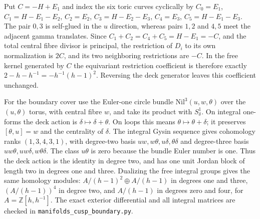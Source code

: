 Put $C=-H+E_1$ and index the six toric curves cyclically by
$C_0=E_1$, $C_1=H-E_1-E_2$, $C_2=E_2$,
$C_3=H-E_2-E_3$, $C_4=E_3$, $C_5=H-E_1-E_3$.
The pair $0,3$ is self-glued in the $u$ direction, whereas
pairs $1,2$ and $4,5$ meet the adjacent gamma translates.
Since $C_1+C_2=C_4+C_5=H-E_1=-C$, and the total central
fibre divisor is principal, the restriction of $D_i$ to its
own normalization is $2C$, and its two neighboring
restrictions are $-C$. In the free kernel generated by $C$
the equivariant restriction coefficient is therefore exactly
$2-h-h^{-1}=-h^{-1}(h-1)^2$. Reversing the deck generator
leaves this coefficient unchanged.

For the boundary cover use the Euler-one circle bundle
$\mathrm{Nil}^3(u,w,\theta)$ over the $(u,\theta)$ torus,
with central fibre $w$, and take its product with $S^1_\delta$.
On integral one-forms the deck action is
$\delta\mapsto\delta+\theta$. On loops this means
$\theta\mapsto\theta+\delta$; it preserves
$[\theta,u]=w$ and the centrality of $\delta$.
The integral Gysin sequence gives cohomology ranks
$(1,3,4,3,1)$, with degree-two basis
$uw,w\theta,u\delta,\theta\delta$ and degree-three basis
$uw\theta,uw\delta,w\theta\delta$. The class $u\theta$
is zero because the bundle Euler number is one. Thus the
deck action is the identity in degree two, and has one
unit Jordan block of length two in degrees one and three.
Dualizing the free integral groups gives the same homology
modules: $A/(h-1)^2\oplus A/(h-1)$ in degrees one and
three, $(A/(h-1))^4$ in degree two, and $A/(h-1)$ in
degrees zero and four, for $A=\mathbb Z[h,h^{-1}]$.
The exact exterior differential and all integral matrices
are checked in \texttt{manifolds\_cusp\_boundary.py}.
